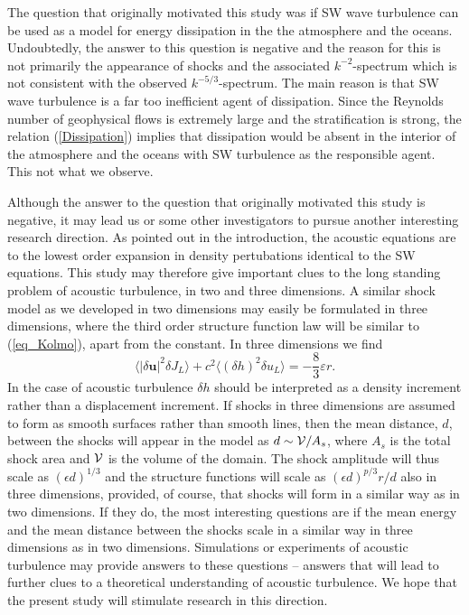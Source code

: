 \documentclass{jfm}
\newcommand{\uu}{\textbf{u}}
\newcommand{\meane}[1]{\langle #1 \rangle}
\begin{document}
The question that originally motivated this study was if SW wave turbulence can be used as a model for energy dissipation in the the atmosphere and the oceans. Undoubtedly, the answer to this question is negative and the reason for this is not primarily the appearance of shocks and the associated $ k^{-2} $-spectrum which is not consistent with the observed $ k^{-5/3} $-spectrum. The main reason is that 
SW wave turbulence is  a far too inefficient agent of dissipation. Since the Reynolds number of geophysical flows is extremely large and the stratification is strong, the  relation (\ref{Dissipation}) implies that dissipation would be absent in the interior of the atmosphere and the oceans with SW turbulence as the responsible agent. This not what we observe.

Although the answer to the question that originally motivated this study is negative, it may lead us or some other investigators to pursue another interesting research direction. As pointed out in the introduction, the acoustic equations are to the lowest order expansion in density pertubations identical to the SW equations. This study may therefore give important clues to the long standing problem of acoustic turbulence, in two and three dimensions. A similar shock model as we developed in two dimensions may easily be formulated in three dimensions, where the third order structure function law will be  similar to (\ref{eq_Kolmo}), apart from the constant. In three dimensions we find
\begin{equation}
\meane{ |\delta \uu|^2 \delta J_L } 
+ c^2\meane{ (\delta h)^2 \delta u_L } = - \frac{8}{3} \varepsilon r. \label{eq_Kolmo3}
\end{equation}
 In the case of acoustic turbulence $ \delta h $ should  be interpreted as a density increment rather than a displacement increment.  If shocks in  three dimensions are assumed to form as  smooth surfaces rather than smooth lines, then the mean distance, $ d $, between the shocks will appear in the model as $ d \sim {\cal{V}}/A_s $, where $ A_{s} $ is the total  shock area and $ \cal{V} $ is the volume of the domain. The shock amplitude will thus scale as $ (\epsilon d)^{1/3} $ and the structure functions will scale as $ (\epsilon d)^{p/3} r/d $ also in three dimensions, provided, of course, that shocks will form in a similar way as in two dimensions. If they do, the most interesting questions are if the mean energy and the mean distance between the shocks scale in a similar way in three dimensions as in two dimensions. Simulations or experiments of acoustic turbulence may provide answers to these questions -- answers that will lead to further clues to a theoretical understanding of acoustic turbulence. 
 We hope that the present study will stimulate research in this direction.  
 



%





\end{document}
